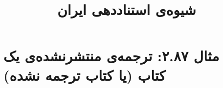 \documentclass[a4paper,10pt]{article}
\begin{document}
\title{شیوه‌ی استناددهی ایران
 }
\author{}
\date{}
\maketitle



\section*{مثال ۲.۸۷: ترجمه‌ی منتشرنشده‌ی یک کتاب (یا کتاب ترجمه نشده)}

\cite{هانسکر1980}\\
\cite{pirumova1977}\\






\end{document}
